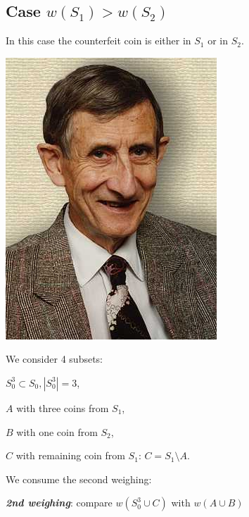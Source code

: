 \subsection{Case $w(S_1) > w(S_2)$}

In this case the counterfeit coin is either in $S_1$ or in $S_2$.

\begin{marginfigure}[0.0in]
\includegraphics[scale=0.5]{freeman.jpg}
\end{marginfigure}

\noindent We consider 4 subsets:

\begin{description}
	\item $S_0^3 \subset S_0, |S_0^3| = 3$,
	\item $A$ with three coins from $S_1$,
	\item $B$ with one coin from $S_2$,
	\item $C$ with remaining coin from $S_1$: $C = S_1 \setminus A$.
\end{description}
	
\noindent We consume the second weighing:
\begin{center} \textbf{\textit{2nd weighing}}: compare $w(S_0^3 \cup C)$ with $w(A \cup B)$ \end{center}

